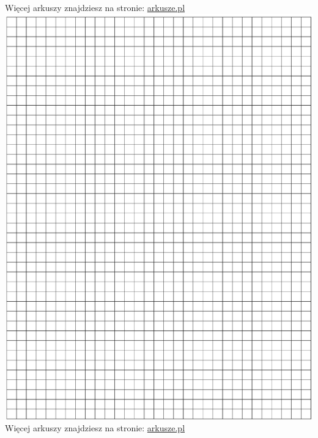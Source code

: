 \documentclass[10pt]{article}
\begin{document}
Więcej arkuszy znajdziesz na stronie: \href{http://arkusze.pl}{arkusze.pl}\\
\includegraphics[max width=\textwidth, center]{2024_11_21_72158d4a4efa7dd894bcg-20}\\
Więcej arkuszy znajdziesz na stronie: \href{http://arkusze.pl}{arkusze.pl}\\
\end{document}
